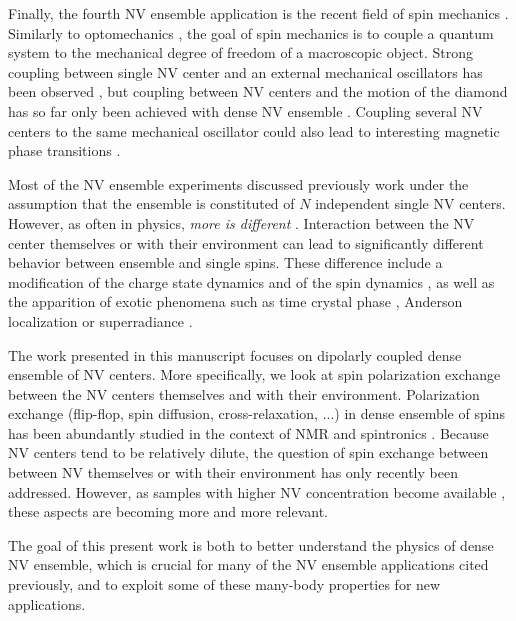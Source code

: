 \documentclass[a4paper, 11pt]{book}
\begin{document}
Finally, the fourth NV ensemble application is the recent field of spin mechanics \citep{perdriat2021spin}. Similarly to optomechanics \citep{aspelmeyer2014cavity}, the goal of spin mechanics is to couple a quantum system to the mechanical degree of freedom of a macroscopic object. Strong coupling between single NV center and an external mechanical oscillators has been observed \citep{rabl2009strong, kolkowitz2012coherent}, but coupling between NV centers and the motion of the diamond has so far only been achieved with dense NV ensemble \citep{delord2020spin, pellet2021magnetic, perdriat2022angle}. Coupling several NV centers to the same mechanical oscillator could also lead to interesting magnetic phase transitions \citep{wei2015magnetic, ma2017proposal}.
   
Most of the NV ensemble experiments discussed previously work under the assumption that the ensemble is constituted of $N$ independent single NV centers. However, as often in physics, \textit{more is different} \citep{anderson1972more}. Interaction between the NV center themselves or with their environment can lead to significantly different behavior between ensemble and single spins. These difference include a modification of the charge state dynamics \citep{giri2018coupled} and of the spin dynamics \citep{dobrovitski2008decoherence, jarmola2012temperature, mrozek2015longitudinal, choi2017depolarization}, as well as the apparition of exotic phenomena such as time crystal phase \citep{choi2017observation}, Anderson localization \citep{kucsko2018critical} or superradiance \citep{bradac2017room, angerer2018superradiant}. 

The work presented in this manuscript focuses on dipolarly coupled dense ensemble of NV centers. More specifically, we look at spin polarization exchange between the NV centers themselves and with their environment. Polarization exchange (flip-flop, spin diffusion, cross-relaxation, ...) in dense ensemble of spins has been abundantly studied in the context of NMR \citep{abragam1978principles} and spintronics \citep{vzutic2004spintronics}. Because NV centers tend to be relatively dilute, the question of spin exchange between between NV themselves \citep{choi2017depolarization} or with their environment \citep{hall2016detection} has only recently been addressed. However, as samples with higher NV concentration become available \citep{acosta2009diamonds, tallaire2020high, shenderova2019synthesis}, these aspects are becoming more and more relevant.

The goal of this present work is both to better understand the physics of dense NV ensemble, which is crucial for many of the NV ensemble applications cited previously, and to exploit some of these many-body properties for new applications.
\end{document}
